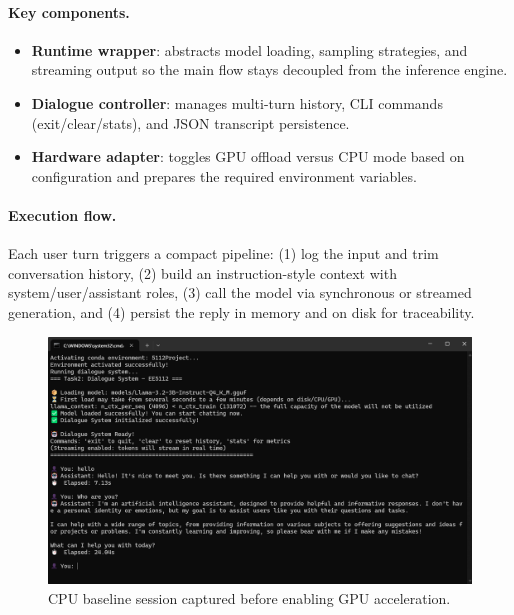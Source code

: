 \documentclass[12pt,a4paper]{article}
\begin{document}
\paragraph{Key components.}
\begin{itemize}[leftmargin=1.2em]
    \item \textbf{Runtime wrapper}: abstracts model loading, sampling strategies, and streaming output so the main flow stays decoupled from the inference engine.
    \item \textbf{Dialogue controller}: manages multi-turn history, CLI commands (exit/clear/stats), and JSON transcript persistence.
    \item \textbf{Hardware adapter}: toggles GPU offload versus CPU mode based on configuration and prepares the required environment variables.
\end{itemize}

\paragraph{Execution flow.}
Each user turn triggers a compact pipeline: (1) log the input and trim conversation history, (2) build an instruction-style context with system/user/assistant roles, (3) call the model via synchronous or streamed generation, and (4) persist the reply in memory and on disk for traceability.

\begin{figure}[H]
    \centering
    \includegraphics[width=0.95\linewidth]{Figures/llama对话.png}
    \caption{CPU baseline session captured before enabling GPU acceleration.}
    \label{fig:llama_cpu_chat}
\end{figure}
\end{document}
